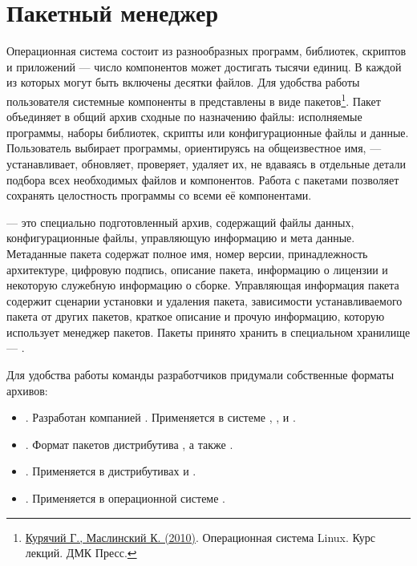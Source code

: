 \chapter{Пакетный менеджер}\label{package-manager}
Операционная система состоит из разнообразных программ, библиотек, скриптов и приложений ---
число компонентов может достигать тысячи единиц. В каждой из которых могут быть включены десятки файлов.
Для удобства работы пользователя системные компоненты в  представлены в виде
пакетов\footnote{\href{https://docs.altlinux.org/books/altlibrary-linuxintro2.pdf}{Курячий Г., Маслинский К. (2010)}.
	Операционная система Linux. Курс лекций. ДМК Пресс.}. Пакет объединяет в общий архив сходные по назначению файлы: исполняемые программы, наборы библиотек, скрипты или конфигурационные файлы и данные.
Пользователь выбирает программы, ориентируясь на общеизвестное имя, --- устанавливает, обновляет, проверяет,
удаляет их, не вдаваясь в отдельные детали подбора всех необходимых файлов и компонентов.
Работа с пакетами позволяет сохранять целостность программы со всеми её компонентами.

 --- это специально подготовленный архив, содержащий файлы данных, конфигурационные файлы,
управляющую информацию и мета данные. Метаданные пакета содержат полное имя, номер версии, принадлежность
архитектуре, цифровую подпись, описание пакета, информацию о лицензии и некоторую служебную информацию
о сборке. Управляющая информация пакета содержит сценарии установки и удаления пакета, зависимости
устанавливаемого пакета от других пакетов, краткое описание и прочую информацию, которую использует
менеджер пакетов. Пакеты принято хранить в специальном хранилище --- .

Для удобства работы команды разработчиков придумали собственные форматы архивов:

\begin{itemize}
	\item {}. Разработан компанией . Применяется в системе , ,  и .
	\item {}. Формат пакетов дистрибутива , а также .
	\item {}. Применяется в дистрибутивах  и .
	\item {}. Применяется в операционной системе .
\end{itemize}

